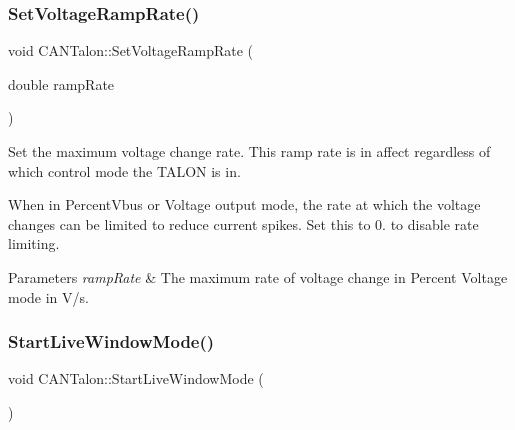 \mbox{\label{class_c_a_n_talon_abb4db45c90b0fe66c595c73880d4f67d}} 
\subsubsection{\texorpdfstring{Set\+Voltage\+Ramp\+Rate()}{SetVoltageRampRate()}}
{\footnotesize\ttfamily void C\+A\+N\+Talon\+::\+Set\+Voltage\+Ramp\+Rate (\begin{DoxyParamCaption}\item[{double}]{ramp\+Rate }\end{DoxyParamCaption})\hspace{0.3cm}{\ttfamily [override]}}

Set the maximum voltage change rate. This ramp rate is in affect regardless of which control mode the T\+A\+L\+ON is in.

When in Percent\+Vbus or Voltage output mode, the rate at which the voltage changes can be limited to reduce current spikes. Set this to 0. to disable rate limiting.


\begin{DoxyParams}{Parameters}
{\em ramp\+Rate} & The maximum rate of voltage change in Percent Voltage mode in V/s. \\
\hline
\end{DoxyParams}
\mbox{\label{class_c_a_n_talon_afa5e6f90b8a5cbd570c4db4f67a84cb4}} 
\subsubsection{\texorpdfstring{Start\+Live\+Window\+Mode()}{StartLiveWindowMode()}}
{\footnotesize\ttfamily void C\+A\+N\+Talon\+::\+Start\+Live\+Window\+Mode (\begin{DoxyParamCaption}{ }\end{DoxyParamCaption})\hspace{0.3cm}{\ttfamily [override]}}

\mbox{\label{class_c_a_n_talon_ad21cbacaf3293535193c7c17a6fefac5}} 
